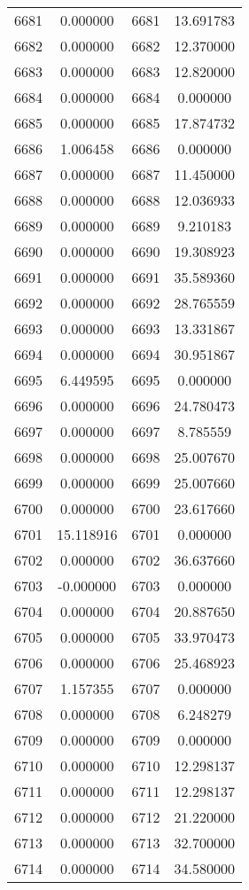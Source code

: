 \documentclass[12pt]{article}
\begin{document}
\begin{longtable}{@{}cccc@{}}
6681 & 0.000000 & 6681 & 13.691783 \\
6682 & 0.000000 & 6682 & 12.370000 \\
6683 & 0.000000 & 6683 & 12.820000 \\
6684 & 0.000000 & 6684 & 0.000000 \\
6685 & 0.000000 & 6685 & 17.874732 \\
6686 & 1.006458 & 6686 & 0.000000 \\
6687 & 0.000000 & 6687 & 11.450000 \\
6688 & 0.000000 & 6688 & 12.036933 \\
6689 & 0.000000 & 6689 & 9.210183 \\
6690 & 0.000000 & 6690 & 19.308923 \\
6691 & 0.000000 & 6691 & 35.589360 \\
6692 & 0.000000 & 6692 & 28.765559 \\
6693 & 0.000000 & 6693 & 13.331867 \\
6694 & 0.000000 & 6694 & 30.951867 \\
6695 & 6.449595 & 6695 & 0.000000 \\
6696 & 0.000000 & 6696 & 24.780473 \\
6697 & 0.000000 & 6697 & 8.785559 \\
6698 & 0.000000 & 6698 & 25.007670 \\
6699 & 0.000000 & 6699 & 25.007660 \\
6700 & 0.000000 & 6700 & 23.617660 \\
6701 & 15.118916 & 6701 & 0.000000 \\
6702 & 0.000000 & 6702 & 36.637660 \\
6703 & -0.000000 & 6703 & 0.000000 \\
6704 & 0.000000 & 6704 & 20.887650 \\
6705 & 0.000000 & 6705 & 33.970473 \\
6706 & 0.000000 & 6706 & 25.468923 \\
6707 & 1.157355 & 6707 & 0.000000 \\
6708 & 0.000000 & 6708 & 6.248279 \\
6709 & 0.000000 & 6709 & 0.000000 \\
6710 & 0.000000 & 6710 & 12.298137 \\
6711 & 0.000000 & 6711 & 12.298137 \\
6712 & 0.000000 & 6712 & 21.220000 \\
6713 & 0.000000 & 6713 & 32.700000 \\
6714 & 0.000000 & 6714 & 34.580000 \\

\end{longtable}
\end{document}
